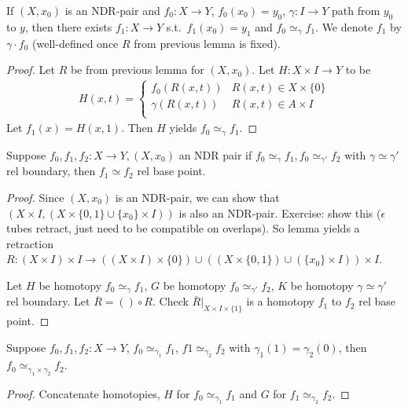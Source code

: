 \documentclass[12pt,class=article,crop=false]{standalone}
\begin{document}
\begin{lem}
If $ (X,x_0)$ is an NDR-pair and  $ f_0: X \to Y$, $ f_0(x_0)=y_0$, $ \gamma: I \to Y$ path from $ y_0$ to $ y$, then there exists  $ f_1: X \to Y$ s.t.\  $ f_1(x_0) = y_1$ and $ f_0 \simeq_\gamma f_1$. We denote $ f_1$ by $ \gamma \cdot f_0$ (well-defined once $ R$ from previous lemma is fixed).
\end{lem}
\begin{proof}
Let $ R$ be from previous lemma for  $ (X,x_0)$. Let $ H : X \times I \to Y$ to be
\begin{align*}
	H(x,t) = \begin{cases}
		f_0(R(x,t)) & R(x,t) \in X \times \{0\} \\
		\gamma(R(x,t)) & R(x,t) \in A \times I\\
	\end{cases}
\end{align*}
	Let $ f_1(x) = H(x,1)$. Then $ H$ yields  $ f_0 \simeq _{ \gamma} f_1$.
\end{proof}

\begin{lem}
Suppose $  f_0,f_1,f_2: X \to Y, (X,x_0)$ an NDR pair if  $ f_0 \simeq _{ \gamma} f_1, f_0 \simeq _{ \gamma'} f_2$ with $ \gamma \simeq \gamma'$ rel boundary, then $ f_1 \simeq f_2$ rel base point.
\end{lem}
\begin{proof}
Since $ (X,x_0)$ is an NDR-pair, we can show that $ (X \times I, (X \times \{0,1\} \cup \{x_0\} \times I ))$ is also an NDR-pair. Exercise: show this ($ \epsilon$ tubes retract, just need to be compatible on overlaps). So lemma yields a retraction $ R: (X \times I) \times I \to ((X \times I) \times \{0\}) \cup ((X \times \{0,1\}) \cup (\{x_0\} \times I  )) \times I$.

Let $ H$ be homotopy  $ f_0 \simeq_{ \gamma} f_1$, $ G$ be homotopy  $ f_0 \simeq_{ \gamma'} f_2$, $ K$ be homotopy  $ \gamma \simeq \gamma'$ rel boundary. Let $ \overline{R} = () \circ R$. Check $ \overline{R}|_{ X \times I \times \{1\} }$ is a homotopy $ f_1$ to $ f_2$ rel base point.
\end{proof}

\begin{lem}
Suppose $ f_0,f_1, f_2 : X \to Y$, $ f_0 \simeq_{ \gamma_1} f_1$, $ f1 \simeq_{ \gamma_2} f_2$ with $ \gamma_1(1) = \gamma_2(0)$, then $ f_0 \simeq_{ \gamma_1 \times \gamma_2} f_2$.
\end{lem}
\begin{proof}
Concatenate homotopies, $ H $ for $ f_0 \simeq _{ \gamma_1} f_1$ and $ G$ for  $ f_1 \simeq _{ \gamma_2} f_2$.
\end{proof}
\end{document}
